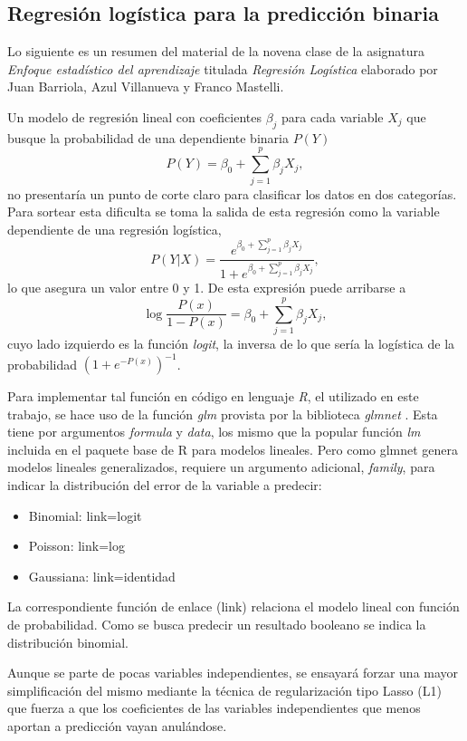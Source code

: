 \documentclass[a4paper]{report}
\begin{document}
\subsection{Regresión logística para la predicción binaria}

Lo siguiente es un resumen del material de la novena clase de la asignatura \emph{Enfoque estadístico del aprendizaje} titulada \emph{Regresión Logística} elaborado por Juan Barriola, Azul Villanueva y Franco Mastelli. 

Un modelo de regresión lineal con coeficientes \(\beta_j\) para cada variable \(X_j\) que busque la probabilidad de una dependiente binaria \(P(Y)\)  
\[
P(Y) = \beta_0 + \sum\limits_{j=1}^p \beta_j X_j,	
\]
no presentaría un punto de corte claro para clasificar los datos en dos categorías.
Para sortear esta dificulta se toma la salida de esta regresión como la variable dependiente de una regresión logística,
\[
P(Y|X)= \frac{e^{\beta_0 + \sum\limits_{j=1}^p \beta_j X_j}}{1+e^{\beta_0 + \sum\limits_{j=1}^p \beta_j X_j}},
\]
lo que asegura un valor entre 0 y 1.
De esta expresión puede arribarse a 
\[
	\log {\frac{P(x)}{1-P(x)}}= \beta_0 + \sum\limits_{j=1}^p \beta_j X_j,
\]
cuyo lado izquierdo es la función \emph{logit}, la inversa de lo que sería la logística de la probabilidad \(\left(1 + e^{-{P(x)}}\right)^{-1}\).

Para implementar tal función en código en lenguaje \emph{R}, el utilizado en este trabajo, se hace uso de la función \emph{glm} provista por la biblioteca \emph{glmnet} \cite{friedman_glmnet_2023}. 
Esta tiene por argumentos \emph{formula} y \emph{data}, los mismo que la popular función \emph{lm} incluida en el paquete base de R para modelos lineales.
Pero como glmnet genera modelos lineales generalizados, requiere un argumento adicional, \emph{family}, para indicar la distribución del error de la variable a predecir:
\begin{itemize}
	\item Binomial: link=logit
	\item Poisson: link=log
	\item Gaussiana: link=identidad
\end{itemize}
La correspondiente función de enlace (link) relaciona el modelo lineal con función de probabilidad.
Como se busca predecir un resultado booleano se indica la distribución binomial.

Aunque se parte de pocas variables independientes, se ensayará forzar una mayor simplificación del mismo mediante la técnica de regularización tipo Lasso (L1) que fuerza a que los coeficientes de las variables independientes que menos aportan a predicción vayan anulándose.
\end{document}
